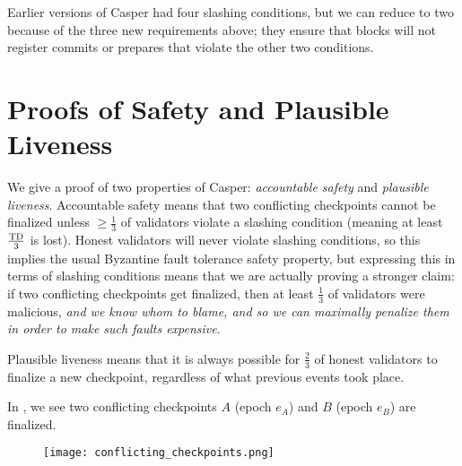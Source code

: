 \documentclass[12pt, final]{article}
\newcommand{\totaldeposit}{\textnormal{TD}\xspace}
\begin{document}
Earlier versions of Casper had four slashing conditions,\cite{minslashing} but we can reduce to two because of the three new requirements above; they ensure that blocks will not register commits or prepares that violate the other two conditions.

\section{Proofs of Safety and Plausible Liveness}
\label{sect:theorems}

We give a proof of two properties of Casper: \textit{accountable safety} and \textit{plausible liveness}. Accountable safety means that two conflicting checkpoints cannot be finalized unless $\geq \frac{1}{3}$ of validators violate a slashing condition (meaning at least $\frac{\totaldeposit}{3}$ is lost). Honest validators will never violate slashing conditions, so this implies the usual Byzantine fault tolerance safety property, but expressing this in terms of slashing conditions means that we are actually proving a stronger claim: if two conflicting checkpoints get finalized, then at least $\frac{1}{3}$ of validators were malicious, \textit{and we know whom to blame, and so we can maximally penalize them in order to make such faults expensive}.

Plausible liveness means that it is always possible for $\frac{2}{3}$ of honest validators to finalize a new checkpoint, regardless of what previous events took place.

In , we see two conflicting checkpoints $A$ (epoch $e_A$) and $B$ (epoch $e_B$) are finalized.

\begin{figure}[h!tb]
\centering
    \texttt{[image: conflicting\_checkpoints.png]}
\caption{}
\label{fig:conflicting_checkpoints}
\end{figure}
\end{document}

